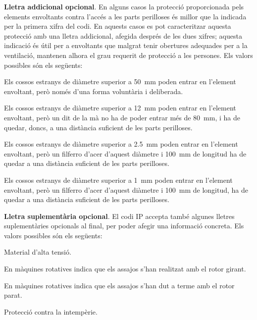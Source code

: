 \textbf{Lletra addicional opcional}. En alguns casos la protecció
proporcionada pels elements envoltants contra l'accés a les parts
perilloses és millor que la indicada per la primera xifra del codi.
En aquests casos es pot caracteritzar aquesta protecció amb una
lletra addicional, afegida després de les dues xifres; aquesta indicació és útil per a  envoltants que malgrat tenir obertures adequades per a la ventilació,  mantenen alhora el
grau requerit de protecció a les persones. Els valors possibles són
els següents:
\begin{list}{}
	{\setlength{\labelwidth}{10mm} \setlength{\leftmargin}{15mm} \setlength{\labelsep}{5mm}}
	\item[A] Els  cossos estranys de diàmetre superior a
	\qty{50}{mm}    poden entrar en l'element envoltant, però només d'una forma voluntària i deliberada.
	\item[B] Els  cossos estranys de diàmetre superior a \qty{12}{mm}
	poden entrar en l'element envoltant, però un dit de la mà no ha de poder entrar més de \qty{80}{mm}, i
	ha de quedar, doncs, a una distància    suficient de les parts perilloses.
	\item[C] Els  cossos estranys de diàmetre superior a \qty{2,5}{mm}
	poden entrar en l'element envoltant, però un filferro d'acer d'aquest diàmetre i \qty{100}{mm}
	de longitud ha de quedar a una distància suficient de les parts perilloses.
	\item[D] Els  cossos estranys de diàmetre superior a \qty{1}{mm}
	poden entrar en l'element envoltant, però un filferro d'acer d'aquest diàmetre i \qty{100}{mm}
	de longitud, ha de quedar a una distància suficient de les parts perilloses.
\end{list}

\textbf{Lletra suplementària opcional}. El codi IP accepta també algunes
lletres suplementàries opcionals al final, per poder afegir una informació concreta. Els valors
possibles són els següents:
\begin{list}{}
	{\setlength{\labelwidth}{10mm} \setlength{\leftmargin}{15mm} \setlength{\labelsep}{5mm}}
	\item[H] Material d'alta tensió.
	\item[M] En màquines rotatives indica que els assajos s'han realitzat amb el
	rotor girant.
	\item[S] En màquines rotatives indica que els assajos s'han dut a terme amb el
	rotor parat.
	\item[W] Protecció contra la intempèrie.
\end{list}



